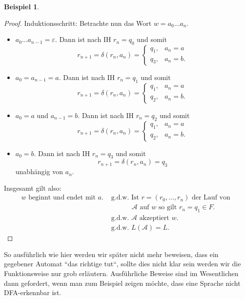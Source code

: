 \documentclass[11pt, a4paper]{article}
\theoremstyle{definition}
\newtheorem{example}[definition]{Beispiel}
\theoremstyle{plain}
\numberwithin{equation}{section}
\begin{document}
\begin{example}
\begin{proof}
		Induktionsschritt: Betrachte nun das Wort \( w = a_0 \ldots a_n \).
		\begin{itemize}
			\item \( a_0 \ldots a_{n-1} = \varepsilon \). Dann ist nach IH \( r_n = q_0 \) und somit
				\[
					r_{n+1} = \delta(r_n, a_n) = \left\lbrace
							\begin{array}{ll}
								q_1, & a_n = a\\
								q_3, & a_n = b.
							\end{array}
						\right.
				\]
			\item \( a_0 = a_{n-1} = a \). Dann ist nach IH \( r_n = q_1 \) und somit
				\[
					r_{n+1} = \delta(r_n, a_n) = \left\lbrace
							\begin{array}{ll}
								q_1, & a_n = a\\
								q_2, & a_n = b.
							\end{array}
						\right.
				\]
			\item \( a_0 = a \) und \( a_{n-1} = b \). Dann ist nach IH \( r_n = q_2 \) und somit
				\[
					r_{n+1} = \delta(r_n, a_n) = \left\lbrace
							\begin{array}{ll}
								q_1, & a_n = a\\
								q_2, & a_n = b.
							\end{array}
						\right.
				\]
			\item \( a_0 = b \). Dann ist nach IH \( r_n = q_3 \) und somit
				\[
					r_{n+1} = \delta(r_n, a_n) = q_3
				\]
				unabhängig von \( a_n \).
		\end{itemize}
		Insgesamt gilt also: 
		\begin{align*}
			w \text{ beginnt und endet mit } a. &\text{ g.d.w. } \text{Ist } r = (r_0, \ldots, r_n) \text{ der Lauf von }\\ &\quad\quad\quad\,\, \mathcal{A} \text{ auf } w \text{ so gilt } r_n = q_1 \in F.\\
			&\text{ g.d.w. } \mathcal{A} \text{ akzeptiert } w.\\
			&\text{ g.d.w. } L(\mathcal{A}) = L.
		\end{align*}
	\end{proof}
\end{example}
So ausführlich wie hier werden wir später nicht mehr beweisen, dass ein gegebener Automat ``das richtige tut``, sollte dies nicht klar sein werden wir die Funktionsweise nur grob erläutern. Ausführliche Beweise sind im Wesentlichen dann gefordert, wenn man zum Beispiel zeigen möchte, dass eine Sprache nicht DFA-erkennbar ist.
\end{document}
